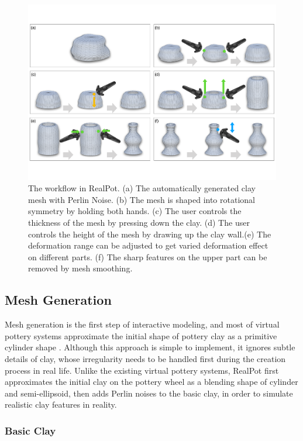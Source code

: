 \documentclass{svjour3}                     %
\begin{document}
\begin{figure}
\includegraphics[width=\textwidth]{fig3}
\caption{The workflow in RealPot. (a) The automatically generated clay mesh with Perlin Noise. (b) The mesh is shaped into rotational symmetry by holding both hands. (c) The user controls the thickness of the mesh by pressing down the clay. (d) The user controls the height of the mesh by drawing up the clay wall.(e) The deformation range can be adjusted to get varied deformation effect on different parts. (f) The sharp features on the upper part can be removed by mesh smoothing.}
\label{fig:workflow}
\end{figure}



\subsection{Mesh Generation}
\label{sec:generation}

Mesh generation is the first step of interactive modeling, and most of virtual pottery systems approximate the initial shape of pottery clay as a primitive cylinder shape \cite{han2007ar,ramani2015gesture,ramani2016extracting}.
Although this approach is simple to implement, it ignores subtle details of clay, whose irregularity needs to be handled first during the creation process in real life.
Unlike the existing virtual pottery systems, RealPot first approximates the initial clay on the pottery wheel as a blending shape of cylinder and semi-ellipsoid, then adds Perlin noises to the basic clay, in order to simulate realistic clay features in reality.

\subsubsection{Basic Clay}
\end{document}
